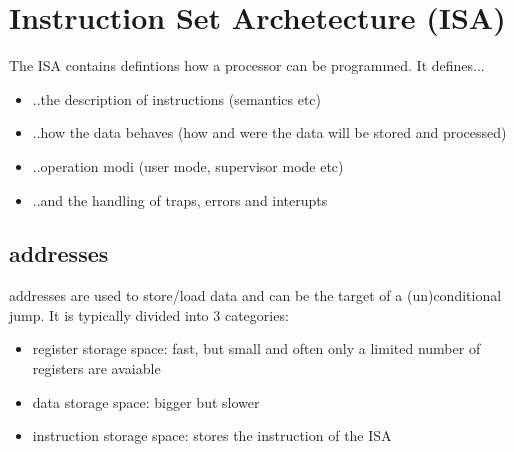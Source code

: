 \documentclass[a4paper]{scrartcl}
\begin{document}
    \section{Instruction Set Archetecture (ISA)}
        The ISA contains defintions how a processor can be programmed. It defines...
        \begin{itemize}
            \item ..the description of instructions (semantics etc)
            \item ..how the data behaves (how and were the data will be stored and processed)
            \item ..operation modi (user mode, supervisor mode etc)
            \item ..and the handling of traps, errors and interupts 
        \end{itemize}
        \subsection{addresses}
            addresses are used to store/load data and can be the target of a (un)conditional jump. %
            It is typically divided into 3 categories: 
            \begin{itemize}
                \item register storage space: fast, but small and often only a limited number of registers are avaiable  
                \item data storage space: bigger but slower
                \item instruction storage space: stores the instruction of the ISA
            \end{itemize}

\end{document}
